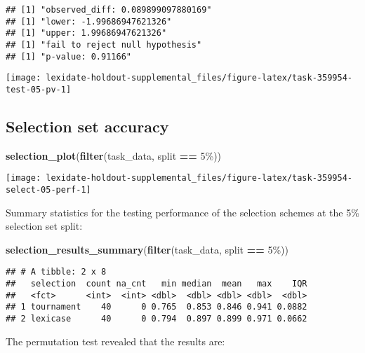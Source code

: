 \documentclass[
]{book}
\newenvironment{Shaded}{\begin{snugshade}}{\end{snugshade}}
\newcommand{\FunctionTok}[1]{\textcolor[rgb]{0.13,0.29,0.53}{\textbf{#1}}}
\newcommand{\NormalTok}[1]{#1}
\newcommand{\SpecialCharTok}[1]{\textcolor[rgb]{0.81,0.36,0.00}{\textbf{#1}}}
\newcommand{\StringTok}[1]{\textcolor[rgb]{0.31,0.60,0.02}{#1}}
\begin{document}
\begin{verbatim}
## [1] "observed_diff: 0.089899097880169"
## [1] "lower: -1.99686947621326"
## [1] "upper: 1.99686947621326"
## [1] "fail to reject null hypothesis"
## [1] "p-value: 0.91166"
\end{verbatim}

\texttt{[image: lexidate-holdout-supplemental\_files/figure-latex/task-359954-test-05-pv-1]}

\hypertarget{selection-set-accuracy-5}{%
\subsection{Selection set accuracy}\label{selection-set-accuracy-5}}

\begin{Shaded}
\begin{Highlighting}[]
\FunctionTok{selection\_plot}\NormalTok{(}\FunctionTok{filter}\NormalTok{(task\_data, split }\SpecialCharTok{==} \StringTok{\textquotesingle{}5\%\textquotesingle{}}\NormalTok{))}
\end{Highlighting}
\end{Shaded}

\texttt{[image: lexidate-holdout-supplemental\_files/figure-latex/task-359954-select-05-perf-1]}

Summary statistics for the testing performance of the selection schemes at the 5\% selection set split:

\begin{Shaded}
\begin{Highlighting}[]
\FunctionTok{selection\_results\_summary}\NormalTok{(}\FunctionTok{filter}\NormalTok{(task\_data, split }\SpecialCharTok{==} \StringTok{\textquotesingle{}5\%\textquotesingle{}}\NormalTok{))}
\end{Highlighting}
\end{Shaded}

\begin{verbatim}
## # A tibble: 2 x 8
##   selection  count na_cnt   min median  mean   max    IQR
##   <fct>      <int>  <int> <dbl>  <dbl> <dbl> <dbl>  <dbl>
## 1 tournament    40      0 0.765  0.853 0.846 0.941 0.0882
## 2 lexicase      40      0 0.794  0.897 0.899 0.971 0.0662
\end{verbatim}

The permutation test revealed that the results are:
\end{document}
